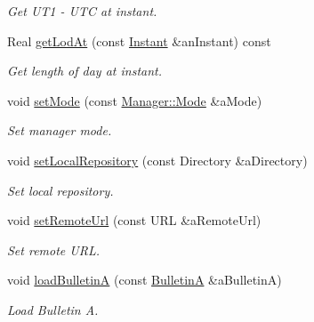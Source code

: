 \begin{DoxyCompactItemize}
\begin{DoxyCompactList}\small\item\em Get U\+T1 -\/ U\+TC at instant. \end{DoxyCompactList}\item 
Real \hyperlink{classostk_1_1physics_1_1coord_1_1frame_1_1provider_1_1iers_1_1_manager_aa533ea91c79df156cd2904c63a58df34}{get\+Lod\+At} (const \hyperlink{classostk_1_1physics_1_1time_1_1_instant}{Instant} \&an\+Instant) const
\begin{DoxyCompactList}\small\item\em Get length of day at instant. \end{DoxyCompactList}\item 
void \hyperlink{classostk_1_1physics_1_1coord_1_1frame_1_1provider_1_1iers_1_1_manager_a6a43ef4397efc074f02d2dbcce01e3f9}{set\+Mode} (const \hyperlink{classostk_1_1physics_1_1coord_1_1frame_1_1provider_1_1iers_1_1_manager_a3a8dd1081d1094069417687b4a3f16ba}{Manager\+::\+Mode} \&a\+Mode)
\begin{DoxyCompactList}\small\item\em Set manager mode. \end{DoxyCompactList}\item 
void \hyperlink{classostk_1_1physics_1_1coord_1_1frame_1_1provider_1_1iers_1_1_manager_abf2cc0416dae265af7d249526bb8f73d}{set\+Local\+Repository} (const Directory \&a\+Directory)
\begin{DoxyCompactList}\small\item\em Set local repository. \end{DoxyCompactList}\item 
void \hyperlink{classostk_1_1physics_1_1coord_1_1frame_1_1provider_1_1iers_1_1_manager_a4beb69ab9704ee45f06ec5cdf3df4dde}{set\+Remote\+Url} (const U\+RL \&a\+Remote\+Url)
\begin{DoxyCompactList}\small\item\em Set remote U\+RL. \end{DoxyCompactList}\item 
void \hyperlink{classostk_1_1physics_1_1coord_1_1frame_1_1provider_1_1iers_1_1_manager_a57d53edcf28bd7d02181384e9ea63dab}{load\+BulletinA} (const \hyperlink{classostk_1_1physics_1_1coord_1_1frame_1_1provider_1_1iers_1_1_bulletin_a}{BulletinA} \&a\+BulletinA)
\begin{DoxyCompactList}\small\item\em Load Bulletin A. \end{DoxyCompactList}\item 

\end{DoxyCompactItemize}
